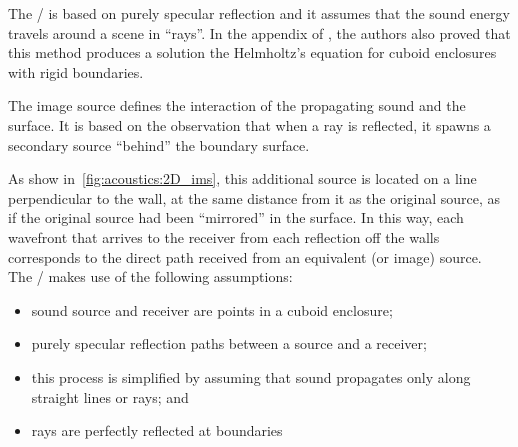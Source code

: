 The \ISM/ is based on purely specular reflection and it assumes that the sound energy travels around a scene in ``rays''.
In the appendix of , the authors also proved that this method produces a solution the Helmholtz's equation
for cuboid enclosures with rigid boundaries.

\begin{figure}[h]
    \resizebox{\linewidth}{!}{
        
    }
\end{figure}

The image source defines the interaction of the propagating sound and the surface.
It is based on the observation that when a ray is reflected, it spawns a secondary source ``behind'' the boundary surface.

\begin{figure}[h]
    \resizebox{\linewidth}{!}{
        
    }
\end{figure}

As show in~\cref{fig:acoustics:2D_ims}, this additional source is located on a line perpendicular to the wall, at the same distance from it as the original source, as if the original source had been “mirrored” in the surface.
In this way, each wavefront that arrives to the receiver from each reflection off the walls corresponds to the direct path received from an equivalent (or image) source.
\\The \ISM/ makes use of the following assumptions:
\begin{itemize}
    \item sound source and receiver are points in a cuboid enclosure;
    \item purely specular reflection paths between a source and a receiver;
    \item this process is simplified by assuming that sound propagates only along straight lines or rays; and
    \item rays are perfectly reflected at boundaries
\end{itemize}

